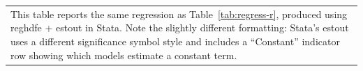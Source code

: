 \documentclass[english,12pt]{article}
\begin{document}
\begin{table}[htbp]
{\vspace{-1.5\baselineskip}
\singlespace
\flushleft
\begin{tabular}{@{}p{\linewidth}@{}}
\footnotesize
This table reports the same regression as Table~\ref{tab:regress-r}, produced using reghdfe + estout in Stata. Note the slightly different formatting: Stata's estout uses a different significance symbol style and includes a ``Constant'' indicator row showing which models estimate a constant term.
\end{tabular}
}
\end{table}
\end{document}
